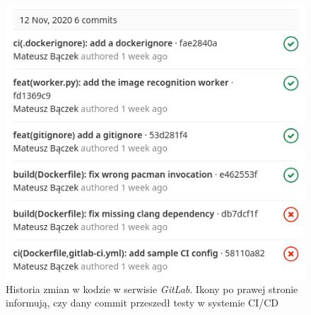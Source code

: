 \begin{figure}[H]
    \centering
    \caption{ Historia zmian w kodzie w serwisie \textit{GitLab}.
    Ikony po prawej stronie informują, czy dany commit przeszedł testy w systemie CI/CD }
\includegraphics[width=.7\linewidth]{rys04/gitlab_ci_commit_status.png}
    
	\label{gitlab_ci_history}
\end{figure}




